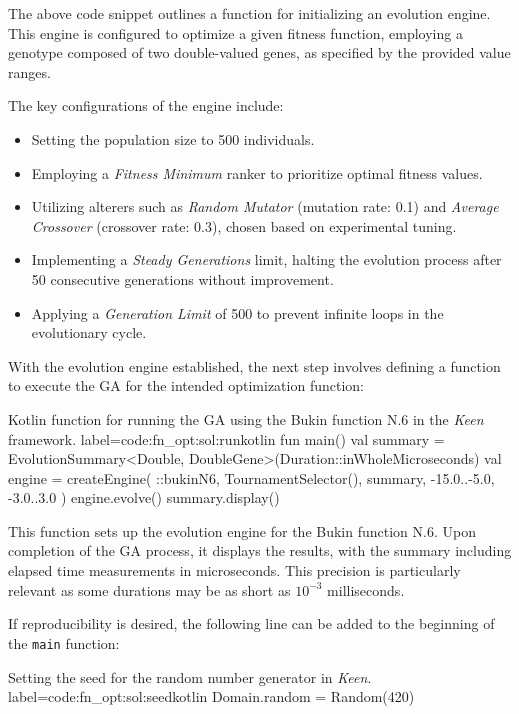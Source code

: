         The above code snippet outlines a function for initializing an evolution 
        engine. This engine is configured to optimize a given fitness function, 
        employing a genotype composed of two double-valued genes, as specified by 
        the provided value ranges.

        The key configurations of the engine include:

        \begin{itemize}
        \item Setting the population size to 500 individuals.
        \item Employing a \textit{Fitness Minimum} ranker to prioritize optimal 
            fitness values.
        \item Utilizing alterers such as \textit{Random Mutator} (mutation rate: 
            0.1) and \textit{Average Crossover} (crossover rate: 0.3), chosen based 
            on experimental tuning.
        \item Implementing a \textit{Steady Generations} limit, halting the 
            evolution process after 50 consecutive generations without improvement.
        \item Applying a \textit{Generation Limit} of 500 to prevent infinite 
            loops in the evolutionary cycle.
        \end{itemize}

        With the evolution engine established, the next step involves defining a function to execute the GA for the 
        intended optimization function:

        \begin{code}{
            Kotlin function for running the GA using the Bukin function N.6 in the \textit{Keen} framework.
        }{label=code:fn_opt:sol:run}{kotlin}
            fun main() {
                val summary = EvolutionSummary<Double, DoubleGene>(Duration::inWholeMicroseconds)
                val engine = createEngine(
                    ::bukinN6, 
                    TournamentSelector(), 
                    summary, 
                    -15.0..-5.0, 
                    -3.0..3.0
                )
                engine.evolve()
                summary.display()
            }
        \end{code}

        This function sets up the evolution engine for the Bukin function N.6. Upon completion of the GA process, it 
        displays the results, with the summary including elapsed time measurements in microseconds. This precision is 
        particularly relevant as some durations may be as short as \(10^{-3}\) milliseconds.

        If reproducibility is desired, the following line can be added to the
        beginning of the \texttt{main} function:

        \begin{code}{
            Setting the seed for the random number generator in \textit{Keen}.
        }{label=code:fn_opt:sol:seed}{kotlin}
            Domain.random = Random(420)
        \end{code}
